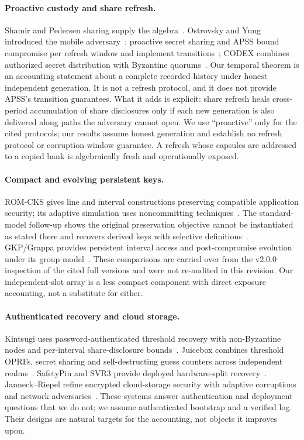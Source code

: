 \documentclass[pdflatex,sn-mathphys-num,twocolumn]{sn-jnl}
\theoremstyle{plain}
\theoremstyle{definition}
\begin{document}
\paragraph{Proactive custody and share refresh.}
Shamir and Pedersen sharing supply the algebra~\cite{shamir1979,pedersen1991}. Ostrovsky and Yung introduced the mobile adversary~\cite{ostrovsky1991}; proactive secret sharing and APSS bound compromise per refresh window and implement transitions~\cite{herzberg1995,zhou2005}; CODEX combines authorized secret distribution with Byzantine quorums~\cite{marsh2004}. Our temporal theorem is an accounting statement about a complete recorded history under honest independent generation. It is not a refresh protocol, and it does not provide APSS's transition guarantees. What it adds is explicit: share refresh heals cross-period accumulation of share disclosures only if each new generation is also delivered along paths the adversary cannot open. We use ``proactive'' only for the cited protocols; our results assume honest generation and establish no refresh protocol or corruption-window guarantee. A refresh whose capsules are addressed to a copied bank is algebraically fresh and operationally exposed.

\paragraph{Compact and evolving persistent keys.}
ROM-CKS gives line and interval constructions preserving compatible application security; its adaptive simulation uses noncommitting techniques~\cite{dodis2024}. The standard-model follow-up shows the original preservation objective cannot be instantiated as stated there and recovers derived keys with selective definitions~\cite{dodisstandard2024}. GKP/Grappa provides persistent interval access and post-compromise evolution under its group model~\cite{backendal2026}. These comparisons are carried over from the v2.0.0 inspection of the cited full versions and were not re-audited in this revision. Our independent-slot array is a less compact component with direct exposure accounting, not a substitute for either.

\paragraph{Authenticated recovery and cloud storage.}
Kintsugi uses password-authenticated threshold recovery with non-Byzantine nodes and per-interval share-disclosure bounds~\cite{ma2025}. Juicebox combines threshold OPRFs, secret sharing and self-destructing guess counters across independent realms~\cite{trapp2025}. SafetyPin and SVR3 provide deployed hardware-split recovery~\cite{dauterman2020,connell2024}. Janneck--Riepel refine encrypted cloud-storage security with adaptive corruptions and network adversaries~\cite{janneck2026}. These systems answer authentication and deployment questions that we do not; we assume authenticated bootstrap and a verified log. Their designs are natural targets for the accounting, not objects it improves upon.
\end{document}
